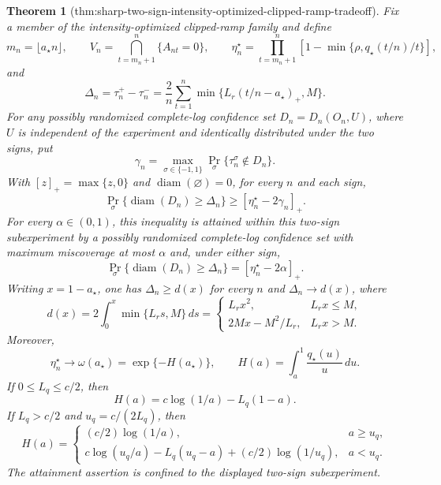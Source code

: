 \documentclass{article}
\newtheorem{theorem}{Theorem}
\begin{document}
\begin{theorem}[thm:sharp-two-sign-intensity-optimized-clipped-ramp-tradeoff]\label{thm:sharp-two-sign-intensity-optimized-clipped-ramp-tradeoff}
Fix a member of the intensity-optimized clipped-ramp family and define
\[
 m_n=\lfloor a_\star n\rfloor,
 \qquad V_n=\bigcap_{t=m_n+1}^{n}\{A_{nt}=0\},
 \qquad
 \eta_n^\star=\prod_{t=m_n+1}^{n}
 \left[1-\min\{\rho,q_\star(t/n)/t\}\right],
\]
and
\[
 \Delta_n=\tau_n^+-\tau_n^-
 =\frac2n\sum_{t=1}^{n}\min\{L_r(t/n-a_\star)_+,M\}.
\]
For any possibly randomized complete-log confidence set \(D_n=D_n(O_n,U)\), where \(U\) is independent of the experiment and identically distributed under the two signs, put
\[
 \gamma_n=\max_{\sigma\in\{-1,1\}}
 \Pr_\sigma\{\tau_n^\sigma\notin D_n\}.
\]
With \([z]_+=\max\{z,0\}\) and \(\operatorname{diam}(\varnothing)=0\), for every \(n\) and each sign,
\[
 \Pr_\sigma\{\operatorname{diam}(D_n)\ge\Delta_n\}
 \ge[\eta_n^\star-2\gamma_n]_+.
\]
For every \(\alpha\in(0,1)\), this inequality is attained within this two-sign subexperiment by a possibly randomized complete-log confidence set with maximum miscoverage at most \(\alpha\) and, under either sign,
\[
 \Pr_\sigma\{\operatorname{diam}(D_n)\ge\Delta_n\}
 =[\eta_n^\star-2\alpha]_+.
\]
Writing \(x=1-a_\star\), one has \(\Delta_n\ge d(x)\) for every \(n\) and \(\Delta_n\to d(x)\), where
\[
 d(x)=2\int_0^x\min\{L_rs,M\}\,ds
 =\begin{cases}
 L_rx^2,&L_rx\le M,\\
 2Mx-M^2/L_r,&L_rx>M.
 \end{cases}
\]
Moreover,
\[
 \eta_n^\star\longrightarrow\omega(a_\star)=\exp\{-H(a_\star)\},
 \qquad H(a)=\int_a^1\frac{q_\star(u)}u\,du.
\]
If \(0\le L_q\le c/2\), then
\[
 H(a)=c\log(1/a)-L_q(1-a).
\]
If \(L_q>c/2\) and \(u_q=c/(2L_q)\), then
\[
 H(a)=
 \begin{cases}
 (c/2)\log(1/a),&a\ge u_q,\\
 c\log(u_q/a)-L_q(u_q-a)+(c/2)\log(1/u_q),&a<u_q.
 \end{cases}
\]
The attainment assertion is confined to the displayed two-sign subexperiment.
\end{theorem}
\end{document}
